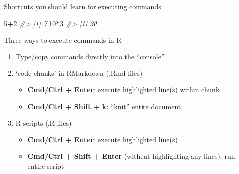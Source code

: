 \documentclass[10pt,ignorenonframetext,]{beamer}
\newenvironment{Shaded}{\begin{snugshade}}{\end{snugshade}}
\newcommand{\DecValTok}[1]{\textcolor[rgb]{0.00,0.00,0.81}{#1}}
\newcommand{\CommentTok}[1]{\textcolor[rgb]{0.56,0.35,0.01}{\textit{#1}}}
\newcommand{\OperatorTok}[1]{\textcolor[rgb]{0.81,0.36,0.00}{\textbf{#1}}}
\providecommand{\tightlist}{%
  \setlength{\itemsep}{0pt}\setlength{\parskip}{0pt}}
\begin{document}
\begin{frame}[fragile]{Shortcuts you should learn for executing
commands}

\begin{Shaded}
\begin{Highlighting}[]
\DecValTok{5}\OperatorTok{+}\DecValTok{2}
\CommentTok{#> [1] 7}
\DecValTok{10}\OperatorTok{*}\DecValTok{3}
\CommentTok{#> [1] 30}
\end{Highlighting}
\end{Shaded}

Three ways to execute commands in R

\begin{enumerate}
\def\labelenumi{\arabic{enumi}.}
\tightlist
\item
  Type/copy commands directly into the ``console''
\item
  `code chunks' in RMarkdown (.Rmd files)

  \begin{itemize}
  \tightlist
  \item
    \textbf{Cmd/Ctrl + Enter}: execute highlighted line(s) within chunk
  \item
    \textbf{Cmd/Ctrl + Shift + k}: ``knit'' entire document
  \end{itemize}
\item
  R scripts (.R files)

  \begin{itemize}
  \tightlist
  \item
    \textbf{Cmd/Ctrl + Enter}: execute highlighted line(s)
  \item
    \textbf{Cmd/Ctrl + Shift + Enter} (without highlighting any lines):
    run entire script
  \end{itemize}
\end{enumerate}

\end{frame}
\end{document}
